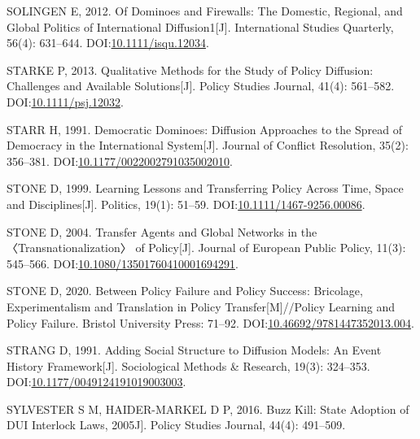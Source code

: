 \documentclass[
  12pt,
]{ctexart}
\newlength{\cslhangindent}
\newlength{\cslentryspacingunit} %
\newenvironment{CSLReferences}[2] %
 {%
  \setlength{\parindent}{0pt}
  \ifodd #1
  \let\oldpar\par
  \def\par{\hangindent=\cslhangindent\oldpar}
  \fi
  \setlength{\parskip}{#2\cslentryspacingunit}
 }%
 {}
\begin{document}
\begin{CSLReferences}{1}{0}
\leavevmode{}%
SOLINGEN E, 2012. Of {Dominoes} and {Firewalls}: {The Domestic}, {Regional}, and {Global Politics} of {International Diffusion1}{[}J{]}. International Studies Quarterly, 56(4): 631--644. DOI:\href{https://doi.org/10.1111/isqu.12034}{10.1111/isqu.12034}.

\leavevmode{}%
STARKE P, 2013. Qualitative {Methods} for the {Study} of {Policy Diffusion}: {Challenges} and {Available Solutions}{[}J{]}. Policy Studies Journal, 41(4): 561--582. DOI:\href{https://doi.org/10.1111/psj.12032}{10.1111/psj.12032}.

\leavevmode{}%
STARR H, 1991. Democratic {Dominoes}: {Diffusion Approaches} to the {Spread} of {Democracy} in the {International System}{[}J{]}. Journal of Conflict Resolution, 35(2): 356--381. DOI:\href{https://doi.org/10.1177/0022002791035002010}{10.1177/0022002791035002010}.

\leavevmode{}%
STONE D, 1999. Learning {Lessons} and {Transferring Policy} Across {Time}, {Space} and {Disciplines}{[}J{]}. Politics, 19(1): 51--59. DOI:\href{https://doi.org/10.1111/1467-9256.00086}{10.1111/1467-9256.00086}.

\leavevmode{}%
STONE D, 2004. Transfer Agents and Global Networks in the {〈Transnationalization〉} of Policy{[}J{]}. Journal of European Public Policy, 11(3): 545--566. DOI:\href{https://doi.org/10.1080/13501760410001694291}{10.1080/13501760410001694291}.

\leavevmode{}%
STONE D, 2020. Between {Policy Failure} and {Policy Success}: {Bricolage}, {Experimentalism} and {Translation} in {Policy Transfer}{[}M{]}//Policy {Learning} and {Policy Failure}. {Bristol University Press}: 71--92. DOI:\href{https://doi.org/10.46692/9781447352013.004}{10.46692/9781447352013.004}.

\leavevmode{}%
STRANG D, 1991. Adding {Social Structure} to {Diffusion Models}: {An Event History Framework}{[}J{]}. Sociological Methods \& Research, 19(3): 324--353. DOI:\href{https://doi.org/10.1177/0049124191019003003}{10.1177/0049124191019003003}.

\leavevmode{}%
SYLVESTER S M, HAIDER-MARKEL D P, 2016. Buzz Kill: {State} Adoption of {DUI} Interlock Laws, 2005\textendash 11{[}J{]}. Policy Studies Journal, 44(4): 491--509.


\end{CSLReferences}
\end{document}
